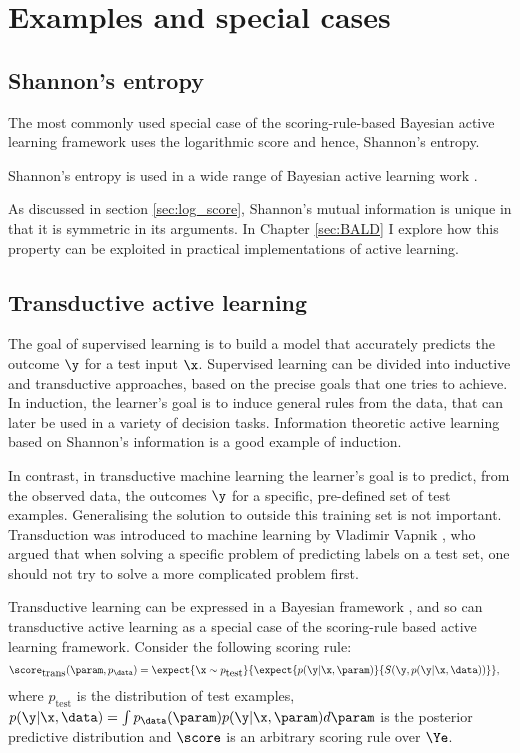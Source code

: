 \section{Examples and special cases}

\subsection{Shannon's entropy\label{sec:active_learning_shannon_information}}

The most commonly used special case of the scoring-rule-based Bayesian active learning framework uses the logarithmic score and hence, Shannon's entropy. 

Shannon's entropy is used in a wide range of Bayesian active learning work \citep{MacKay1992,Lawrence2004,Krause2006,Ji2008,Settles2010,Houlsby2011,Huszar2012quantum}.

As discussed in section \ref{sec:log_score}, Shannon's mutual information is unique in that it is symmetric in its arguments. In Chapter \ref{sec:BALD} I explore how this property can be exploited in practical implementations of active learning.

\subsection{Transductive active learning}

The goal of supervised learning is to build a model that accurately predicts the outcome $\y$ for a test input $\x$. Supervised learning can be divided into inductive and transductive approaches, based on the precise goals that one tries to achieve. In induction, the learner's goal is to induce general rules from the data, that can later be used in a variety of decision tasks. Information theoretic active learning based on Shannon's information is a good example of induction.

In contrast, in transductive machine learning the learner's goal is to predict, from the observed data, the outcomes $\y$ for a specific, pre-defined set of test examples. Generalising the solution to outside this training set is not important. Transduction was introduced to machine learning by Vladimir Vapnik \citep[see \eg][]{gammerman1998learning}, who argued that when solving a specific problem of predicting labels on a test set, one should not try to solve a more complicated problem first.

Transductive learning can be expressed in a Bayesian framework \citep{Graepel1999}, and so can transductive active learning as a special case of the scoring-rule based active learning framework. Consider the following scoring rule:
%
\begin{align}
	\score_{\mbox{trans}}(\param,p_\data) &= \expect{\x\sim p_{\mbox{test}}}{\expect{p(\y\vert\x,\param)}{S(\y,p(\y\vert\x,\data))}},
\end{align}
%
where $p_{\mbox{test}}$ is the distribution of test examples, $p(\y\vert\x,\data)=\int p_{\data}(\param) p(\y\vert\x,\param) d\param $ is the posterior predictive distribution and $\score$ is an arbitrary scoring rule over $\Ye$.

